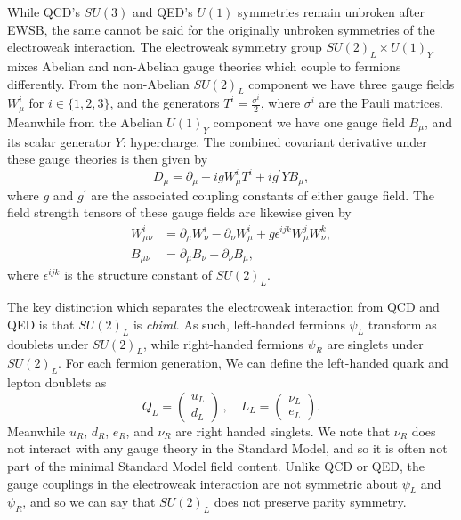 While QCD's $SU(3)$ and QED's $U(1)$ symmetries remain unbroken after EWSB, the same cannot be said for the originally unbroken symmetries of the electroweak interaction.  The electroweak symmetry group $SU(2)_L\times U(1)_Y$ mixes Abelian and non-Abelian gauge theories which couple to fermions differently.  From the non-Abelian $SU(2)_L$ component we have three gauge fields $W^i_\mu$ for $i\in\{1,2,3\}$, and the generators $T^i = \frac{\sigma^i}{2}$, where $\sigma^i$ are the Pauli matrices. Meanwhile from the Abelian $U(1)_Y$ component we have one gauge field $B_\mu$, and its scalar generator $Y$: hypercharge.  The combined covariant derivative under these gauge theories is then given by 
\begin{equation}\label{eq:EQ_covariant-derive}
    D_\mu = \partial_\mu + igW^i_\mu T^i + ig^\prime Y B_\mu,   
\end{equation}
where $g$ and $g^\prime$ are the associated coupling constants of either gauge field.  The field strength tensors of these gauge fields are likewise given by
\begin{equation}
\begin{split}
    W^i_{\mu\nu} &= \partial_\mu W^i_\nu - \partial_\nu W^i_\mu + g\epsilon^{ijk}W^j_\mu W^k_\nu, \\
    B_{\mu\nu} &= \partial_\mu B_\nu - \partial_\nu B_\mu,
\end{split}
\end{equation}
where $\epsilon^{ijk}$ is the structure constant of $SU(2)_L$.

The key distinction which separates the electroweak interaction from QCD and QED is that $SU(2)_L$ is \textit{chiral}.  As such, left-handed fermions $\psi_L$ transform as doublets under $SU(2)_L$, while right-handed fermions $\psi_R$ are singlets under $SU(2)_L$.  For each fermion generation, We can define the left-handed quark and lepton doublets as
\begin{equation}\label{doublets}
    Q_L =\begin{pmatrix}  u_L\\d_L \end{pmatrix}\, , \quad
    L_L =\begin{pmatrix} \nu_L \\ e_L  \end{pmatrix}.
\end{equation}
Meanwhile $u_R$, $d_R$, $e_R$, and $\nu_R$ are right handed singlets.  We note that $\nu_R$ does not interact with any gauge theory in the Standard Model, and so it is often not part of the minimal Standard Model field content.  Unlike QCD or QED, the gauge couplings in the electroweak interaction are not symmetric about $\psi_L$ and $\psi_R$, and so we can say that $SU(2)_L$ does not preserve parity symmetry.  

